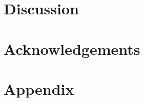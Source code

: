 \documentclass[twoside]{article}\usepackage[]{graphicx}\usepackage[]{color}
\begin{document}
\begin{multicols}{2}
\section{Discussion}

\lipsum[1-4]





\section{Acknowledgements}

\lipsum[4-5]




\end{multicols}

 




\section{Appendix}
\end{document}
